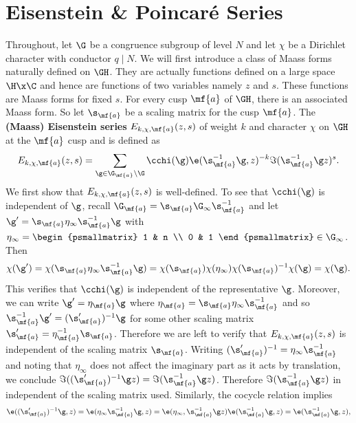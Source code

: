   \section{Eisenstein \& Poincar\'e Series}
    Throughout, let $\G$ be a congruence subgroup of level $N$ and let $\chi$ be a Dirichlet character with conductor $q \mid N$. We will first introduce a class of Maass forms naturally defined on $\GH$. They are actually functions defined on a large space $\H \x \C$ and hence are functions of two variables namely $z$ and $s$. These functions are Maass forms for fixed $s$. For every cusp $\mf{a}$ of $\GH$, there is an associated Maass form. So let $\s_{\mf{a}}$ be a scaling matrix for the cusp $\mf{a}$. The \textbf{(Maass) Eisenstein series} $E_{k,\chi,\mf{a}}(z,s)$ of weight $k$ and character $\chi$ on $\GH$ at the $\mf{a}$ cusp and is defined as
    \[
      E_{k,\chi,\mf{a}}(z,s) = \sum_{\g \in \G_{\mf{a}}\backslash\G}\cchi(\g)\e(\s_{\mf{a}}^{-1}\g,z)^{-k}\Im(\s_{\mf{a}}^{-1}\g z)^{s}.
    \]
    We first show that $E_{k,\chi,\mf{a}}(z,s)$ is well-defined. To see that $\cchi(\g)$ is independent of $\g$, recall $\G_{\mf{a}} = \s_{\mf{a}}\G_{\infty}\s_{\mf{a}}^{-1}$ and let $\g' = \s_{\mf{a}}\eta_{\infty}\s_{\mf{a}}^{-1}\g$ with $\eta_{\infty} = \begin{psmallmatrix} 1 & n \\ 0 & 1 \end{psmallmatrix} \in \G_{\infty}$. Then
    \[
      \chi(\g') = \chi(\s_{\mf{a}}\eta_{\infty}\s_{\mf{a}}^{-1}\g) = \chi(\s_{\mf{a}})\chi(\eta_{\infty})\chi(\s_{\mf{a}})^{-1}\chi(\g) = \chi(\g).
    \]
    This verifies that $\cchi(\g)$ is independent of the representative $\g$. Moreover, we can write $\g' = \eta_{\mf{a}}\g$ where $\eta_{\mf{a}} = \s_{\mf{a}}\eta_{\infty}\s_{\mf{a}}^{-1}$ and so $\s_{\mf{a}}^{-1}\g' = (\s_{\mf{a}}')^{-1}\g$ for some other scaling matrix $\s_{\mf{a}}' = \eta_{\mf{a}}^{-1}\s_{\mf{a}}$. Therefore we are left to verify that $E_{k,\chi,\mf{a}}(z,s)$ is independent of the scaling matrix $\s_{\mf{a}}$. Writing $(\s_{\mf{a}}')^{-1} = \eta_{\infty}\s_{\mf{a}}^{-1}$ and noting that $\eta_{\infty}$ does not affect the imaginary part as it acts by translation, we conclude $\Im((\s_{\mf{a}}')^{-1}\g z) = \Im(\s_{\mf{a}}^{-1}\g z)$. Therefore $\Im(\s_{\mf{a}}^{-1}\g z)$ in independent of the scaling matrix used. Similarly, the cocycle relation implies
    \[
      \e((\s_{\mf{a}}')^{-1}\g,z) = \e(\eta_{\infty}\s_{\mf{a}}^{-1}\g,z) = \e(\eta_{\infty},\s_{\mf{a}}^{-1}\g z)\e(\s_{\mf{a}}^{-1}\g,z) = \e(\s_{\mf{a}}^{-1}\g,z),
    \]
